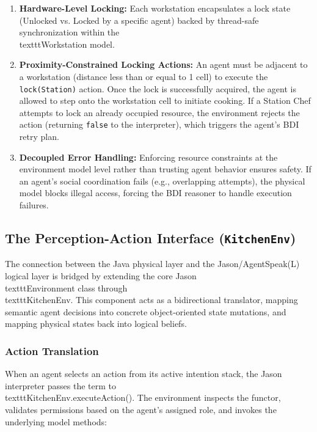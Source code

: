 \documentclass{scrartcl}
\begin{document}
\begin{enumerate}
\item \textbf{Hardware-Level Locking:} Each workstation encapsulates a lock state (Unlocked vs. Locked by a specific agent) backed by thread-safe synchronization within the \\texttt{Workstation} model.
\item \textbf{Proximity-Constrained Locking Actions:} An agent must be adjacent to a workstation (distance less than or equal to 1 cell) to execute the \texttt{lock(Station)} action. Once the lock is successfully acquired, the agent is allowed to step onto the workstation cell to initiate cooking. If a Station Chef attempts to lock an already occupied resource, the environment rejects the action (returning \texttt{false} to the interpreter), which triggers the agent's BDI retry plan.
\item \textbf{Decoupled Error Handling:} Enforcing resource constraints at the environment model level rather than trusting agent behavior ensures safety. If an agent's social coordination fails (e.g., overlapping attempts), the physical model blocks illegal access, forcing the BDI reasoner to handle execution failures.
\end{enumerate}

\subsection{The Perception-Action Interface (\texttt{KitchenEnv})}

The connection between the Java physical layer and the Jason/AgentSpeak(L) logical layer is bridged by extending the core Jason \\texttt{Environment} class through \\texttt{KitchenEnv}. This component acts as a bidirectional translator, mapping semantic agent decisions into concrete object-oriented state mutations, and mapping physical states back into logical beliefs.

\subsubsection{Action Translation}
When an agent selects an action from its active intention stack, the Jason interpreter passes the term to \\texttt{KitchenEnv.executeAction()}. The environment inspects the functor, validates permissions based on the agent's assigned role, and invokes the underlying model methods:
\end{document}

